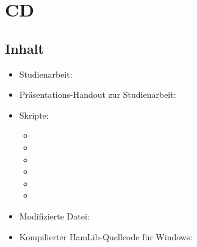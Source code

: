 


\appendix


\renewcommand{\thechapter}{Anhang \Alph{chapter}:}


\chapter{CD}
\label{chap:cdappendix}

\section*{Inhalt}

\begin{itemize}
	\parskip0pt
	\item Studienarbeit: 
	\item Präsentations-Handout zur Studienarbeit: 
	\item Skripte:
	\begin{itemize}
		\item {}
		\item {}
		\item {}
		\item {}
		\item {}
		\item {}
	\end{itemize}
	\item Modifizierte Datei: 
	\item Kompilierter HamLib-Quellcode für Windows: 
\end{itemize}

